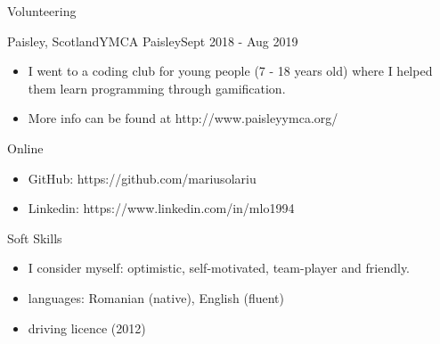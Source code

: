 \documentclass[]{mcdowellcv}
\begin{document}
	\begin{cvsection}{Volunteering}
		\begin{cvsubsection}{Paisley, Scotland}{YMCA Paisley}{Sept 2018 - Aug 2019}
			\begin{itemize}
				\item I went to a coding club for young people (7 - 18 years old) where I helped them learn programming through gamification. 
				\item More info can be found at http://www.paisleyymca.org/
			\end{itemize}
		\end{cvsubsection}
	\end{cvsection}

	\begin{cvsection}{Online}
		\begin{cvsubsection}{}{}{}
			\begin{itemize}
				\item GitHub: https://github.com/mariusolariu
				\item Linkedin: https://www.linkedin.com/in/mlo1994
			\end{itemize}
		\end{cvsubsection}
	\end{cvsection}

	\begin{cvsection}{Soft Skills}
		\begin{cvsubsection}{}{}{}
			\begin{itemize}
				\item I consider myself: optimistic, self-motivated, team-player and friendly.
				\item languages: Romanian (native), English (fluent)
				\item driving licence (2012)
			\end{itemize}
		\end{cvsubsection}
	\end{cvsection}
	
\end{document}
